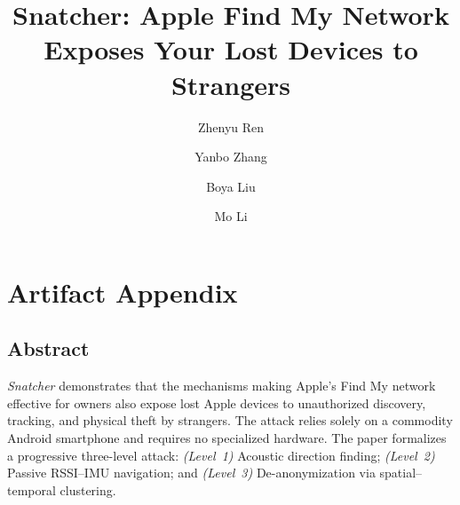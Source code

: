 \documentclass[nonacm,sigconf]{acmart}
\begin{document}
\hypersetup{colorlinks=true,allcolors=blue}
\raggedbottom   %
\setlength{\textfloatsep}{8pt plus 2pt minus 2pt}
\setlength{\floatsep}{8pt plus 2pt minus 2pt}
\setlength{\intextsep}{8pt plus 2pt minus 2pt}
\setlength{\abovecaptionskip}{4pt}
\setlength{\belowcaptionskip}{1pt}

\title{Snatcher: Apple Find My Network Exposes Your Lost Devices to Strangers}

\author{Zhenyu Ren}
\author{Yanbo Zhang}
\authornotemark[1]
\author{Boya Liu}
\author{Mo Li}

\maketitle

\appendix
\section{Artifact Appendix}

\subsection{Abstract}
\textit{Snatcher} demonstrates that the mechanisms making Apple's Find My
network effective for owners also expose lost Apple devices to unauthorized
discovery, tracking, and physical theft by strangers. The attack relies solely
on a commodity Android smartphone and requires no specialized hardware. The
paper formalizes a progressive three-level attack: \textit{(Level~1)} Acoustic
direction finding; \textit{(Level~2)} Passive RSSI--IMU navigation; and
\textit{(Level~3)} De-anonymization via spatial--temporal clustering.
\end{document}
